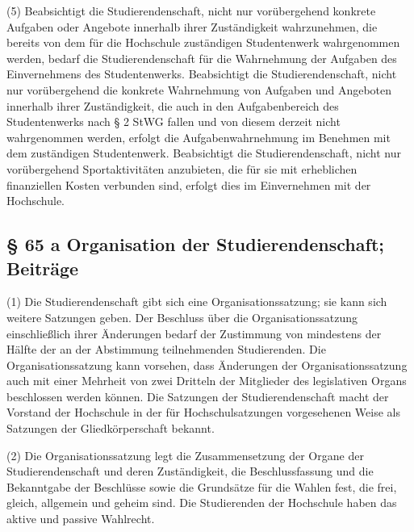 \documentclass[
10pt,
a4paper,
twoside,								%
titlepage=false,							%
draft=false								%
]{scrartcl}
\begin{document}
(5) Beabsichtigt die Studierendenschaft, nicht nur vorübergehend konkrete Aufgaben oder Angebote innerhalb ihrer Zuständigkeit wahrzunehmen, die bereits von dem für die Hochschule zuständigen Studentenwerk wahrgenommen werden, bedarf die Studierendenschaft für die Wahrnehmung der Aufgaben des Einvernehmens des Studentenwerks. Beabsichtigt die Studierendenschaft, nicht nur vorübergehend die konkrete Wahrnehmung von Aufgaben und Angeboten innerhalb ihrer Zuständigkeit, die auch in den Aufgabenbereich des Studentenwerks nach § 2 StWG fallen und von diesem derzeit nicht wahrgenommen werden, erfolgt die Aufgabenwahrnehmung im Benehmen mit dem zuständigen Studentenwerk. Beabsichtigt die Studierendenschaft, nicht nur vorübergehend Sportaktivitäten anzubieten, die für sie mit erheblichen finanziellen Kosten verbunden sind, erfolgt dies im Einvernehmen mit der Hochschule.


\subsection{§ 65 a Organisation der Studierendenschaft; Beiträge}

(1) Die Studierendenschaft gibt sich eine Organisationssatzung; sie kann sich weitere Satzungen geben. Der Beschluss über die Organisationssatzung einschließlich ihrer Änderungen bedarf der Zustimmung von mindestens der Hälfte der an der Abstimmung teilnehmenden Studierenden. Die Organisationssatzung kann vorsehen, dass Änderungen der Organisationssatzung auch mit einer Mehrheit von zwei Dritteln der Mitglieder des legislativen Organs beschlossen werden können. Die Satzungen der Studierendenschaft macht der Vorstand der Hochschule in der für Hochschulsatzungen vorgesehenen Weise als Satzungen der Gliedkörperschaft bekannt.

(2) Die Organisationssatzung legt die Zusammensetzung der Organe der Studierendenschaft und deren Zuständigkeit, die Beschlussfassung und die Bekanntgabe der Beschlüsse sowie die Grundsätze für die Wahlen fest, die frei, gleich, allgemein und geheim sind. Die Studierenden der Hochschule haben das aktive und passive Wahlrecht.
\end{document}
